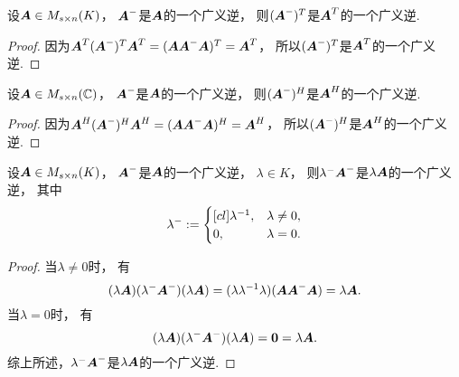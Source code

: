 \begin{theorem}
设\(\boldsymbol{A} \in M_{s \times n}(K)\)，
\(\boldsymbol{A}^-\)是\(\boldsymbol{A}\)的一个广义逆，
则\((\boldsymbol{A}^-)^T\)是\(\boldsymbol{A}^T\)的一个广义逆.
\begin{proof}
因为\(
	\boldsymbol{A}^T (\boldsymbol{A}^-)^T \boldsymbol{A}^T
	= (\boldsymbol{A} \boldsymbol{A}^- \boldsymbol{A})^T
	= \boldsymbol{A}^T
\)，
所以\((\boldsymbol{A}^-)^T\)是\(\boldsymbol{A}^T\)的一个广义逆.
\end{proof}
\end{theorem}

\begin{theorem}
设\(\boldsymbol{A} \in M_{s \times n}(\mathbb{C})\)，
\(\boldsymbol{A}^-\)是\(\boldsymbol{A}\)的一个广义逆，
则\((\boldsymbol{A}^-)^H\)是\(\boldsymbol{A}^H\)的一个广义逆.
\begin{proof}
因为\(
	\boldsymbol{A}^H (\boldsymbol{A}^-)^H \boldsymbol{A}^H
	= (\boldsymbol{A} \boldsymbol{A}^- \boldsymbol{A})^H
	= \boldsymbol{A}^H
\)，
所以\((\boldsymbol{A}^-)^H\)是\(\boldsymbol{A}^H\)的一个广义逆.
\end{proof}
\end{theorem}

\begin{theorem}
设\(\boldsymbol{A} \in M_{s \times n}(K)\)，
\(\boldsymbol{A}^-\)是\(\boldsymbol{A}\)的一个广义逆，
\(\lambda \in K\)，
则\(\lambda^- \boldsymbol{A}^-\)是\(\lambda \boldsymbol{A}\)的一个广义逆，
其中\begin{equation*}
	\lambda^-
	:=
	\begin{cases}[cl]
		\lambda^{-1}, & \lambda\neq0, \\
		0, & \lambda=0.
	\end{cases}
\end{equation*}
\begin{proof}
当\(\lambda\neq0\)时，
有\begin{equation*}
	(\lambda \boldsymbol{A})
	(\lambda^- \boldsymbol{A}^-)
	(\lambda \boldsymbol{A})
	= (\lambda \lambda^{-1} \lambda) (\boldsymbol{A} \boldsymbol{A}^- \boldsymbol{A})
	= \lambda \boldsymbol{A}.
\end{equation*}
当\(\lambda=0\)时，
有\begin{equation*}
	(\lambda \boldsymbol{A})
	(\lambda^- \boldsymbol{A}^-)
	(\lambda \boldsymbol{A})
	= \boldsymbol0
	= \lambda \boldsymbol{A}.
\end{equation*}
综上所述，\(\lambda^- \boldsymbol{A}^-\)是\(\lambda \boldsymbol{A}\)的一个广义逆.
\end{proof}
\end{theorem}

